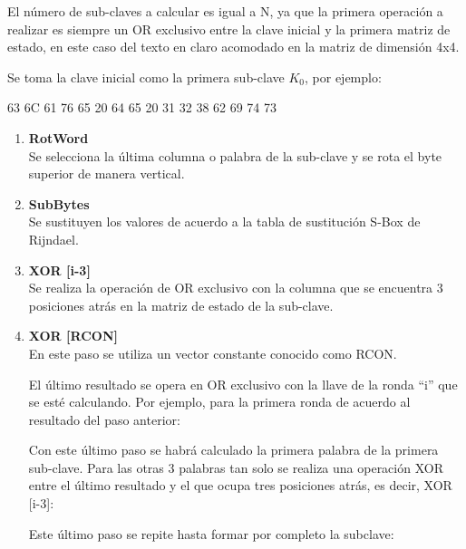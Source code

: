\documentclass[../main/main.tex]{subfiles}
\begin{document}
      El número de sub-claves a calcular es igual a N, ya que la primera operación a realizar es siempre un OR exclusivo entre la clave inicial y la primera matriz de estado, en este caso del texto en claro acomodado en la matriz de dimensión 4x4.

      Se toma la clave inicial como la primera sub-clave $K_0$, por ejemplo:

      \begin{center}
        63 6C 61 76 65 20 64 65 20 31 32 38 62 69 74 73
      \end{center}

      \begin{enumerate}[label=\textbf{\arabic*}.]
        \item \textbf{RotWord} \\
          Se selecciona la última columna o palabra de la sub-clave y se rota el byte superior de manera vertical.

          \begin{table}[H]
            \centering
            
          \end{table}

        \item \textbf{SubBytes} \\
          Se sustituyen los valores de acuerdo a la tabla de sustitución S-Box de Rijndael.

          

        \item \textbf{XOR [i-3]} \\
          Se realiza la operación de OR exclusivo con la columna que se encuentra 3 posiciones atrás en la matriz de estado de la sub-clave.

          

        \item \textbf{XOR [RCON]} \\
          En este paso se utiliza un vector constante conocido como RCON.

          

          El último resultado se opera en OR exclusivo con la llave de la ronda “i” que se esté calculando. Por ejemplo, para la primera ronda de acuerdo al resultado del paso anterior:

          

          Con este último paso se habrá calculado la primera palabra de la primera sub-clave. Para las otras 3 palabras tan solo se realiza una operación XOR entre el último resultado y el que ocupa tres posiciones atrás, es decir, XOR [i-3]:

          \begin{table}[H]
            \centering
            
          \end{table}

          Este último paso se repite hasta formar por completo la subclave:

          
      \end{enumerate}
\end{document}
